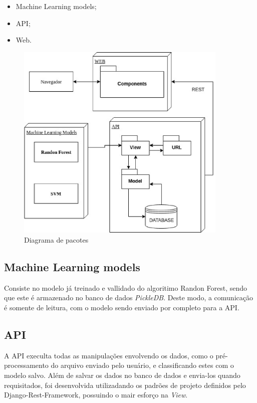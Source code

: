 \begin{anexosenv}
	\begin{itemize}
		\item Machine Learning models;
		\item API;
		\item Web.
	\end{itemize}

	\begin{figure}[!htb]
		\centering
		 \includegraphics[width=0.9\textwidth]{figuras/diagrama_pacotes.eps}
		 \caption{Diagrama de pacotes}
		 \label{diagramadepacotes}
	 \end{figure}

	\subsection{Machine Learning models}
	Consiste no modelo já treinado e vallidado do algoritimo Randon Forest, sendo que este é armazenado no banco de dados \textit{PickleDB}. Deste modo, a comunicação é somente de leitura, com o modelo sendo enviado por completo para a API.
	\subsection{API}
	A API execulta todas as manipulações envolvendo os dados, como o pré-processamento do arquivo enviado pelo usuário, e classificando estes com o modelo salvo. Além de salvar os dados no banco de dados e envia-los quando requisitados, foi desenvolvida utilizadando os padrões de projeto definidos pelo Django-Rest-Framework, possuindo o mair esforço na \textit{View}.


\end{anexosenv}
